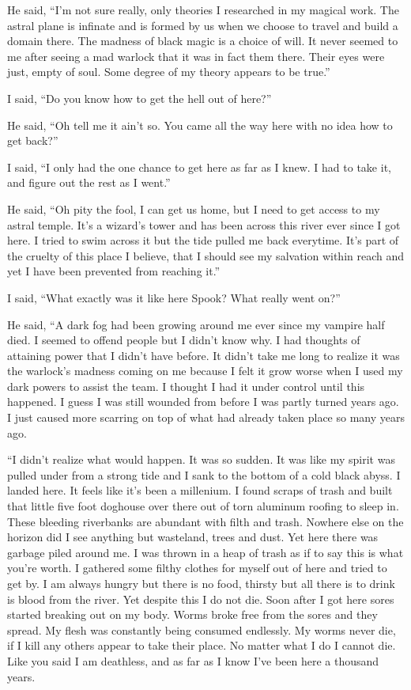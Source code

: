 He said, ``I'm not sure really, only theories I researched in my magical work. The astral plane is infinate and is formed by us when we choose to travel and build a domain there. The madness of black magic is a choice of will. It never seemed to me after seeing a mad warlock that it was in fact them there. Their eyes were just, empty of soul. Some degree of my theory appears to be true.''

I said, ``Do you know how to get the hell out of here?''

He said, ``Oh tell me it ain't so. You came all the way here with no idea how to get back?''

I said, ``I only had the one chance to get here as far as I knew. I had to take it, and figure out the rest as I went.''

He said, ``Oh pity the fool, I can get us home, but I need to get access to my astral temple. It's a wizard's tower and has been across this river ever since I got here. I tried to swim across it but the tide pulled me back everytime. It's part of the cruelty of this place I believe, that I should see my salvation within reach and yet I have been prevented from reaching it.''

I said, ``What exactly was it like here Spook? What really went on?''

He said, ``A dark fog had been growing around me ever since my vampire half died. I seemed to offend people but I didn't know why. I had thoughts of attaining power that I didn't have before. It didn't take me long to realize it was the warlock's madness coming on me because I felt it grow worse when I used my dark powers to assist the team. I thought I had it under control until this happened. I guess I was still wounded from before I was partly turned years ago. I just caused more scarring on top of what had already taken place so many years ago.

``I didn't realize what would happen. It was so sudden. It was like my spirit was pulled under from a strong tide and I sank to the bottom of a cold black abyss. I landed here. It feels like it's been a millenium. I found scraps of trash and built that little five foot doghouse over there out of torn aluminum roofing to sleep in. These bleeding riverbanks are abundant with filth and trash. Nowhere else on the horizon did I see anything but wasteland, trees and dust. Yet here there was garbage piled around me. I was thrown in a heap of trash as if to say this is what you're worth. I gathered some filthy clothes for myself out of here and tried to get by. I am always hungry but there is no food, thirsty but all there is to drink is blood from the river. Yet despite this I do not die. Soon after I got here sores started breaking out on my body. Worms broke free from the sores and they spread. My flesh was constantly being consumed endlessly. My worms never die, if I kill any others appear to take their place. No matter what I do I cannot die. Like you said I am deathless, and as far as I know I've been here a thousand years.

